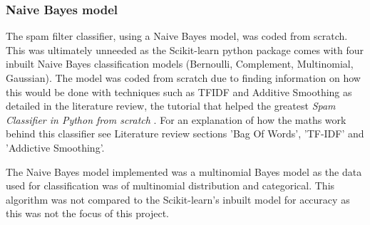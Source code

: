 \documentclass[oneside, 12pt]{article}
\begin{document}
		\subsubsection{Naive Bayes model}
		
		The spam filter classifier, using a Naive Bayes model, was coded from scratch. This was ultimately unneeded as the Scikit-learn python package comes with four inbuilt Naive Bayes classification models (Bernoulli, Complement, Multinomial, Gaussian)\cite{NValgor}. The model was coded from scratch due to finding information on how this would be done with techniques such as TFIDF and Additive Smoothing as detailed in the literature review, the tutorial that helped the greatest \textit{Spam Classifier in Python from scratch} \cite{SpamCScratch} \cite{SpamOrHamGit}. For an explanation of how the maths work behind this classifier see Literature review sections 'Bag Of Words', 'TF-IDF' and 'Addictive Smoothing'. 
		
		The Naive Bayes model implemented was a multinomial Bayes model as the data used for classification was of multinomial distribution and categorical. This algorithm was not compared to the Scikit-learn's inbuilt model for accuracy as this was not the focus of this project. 
		
\end{document}
